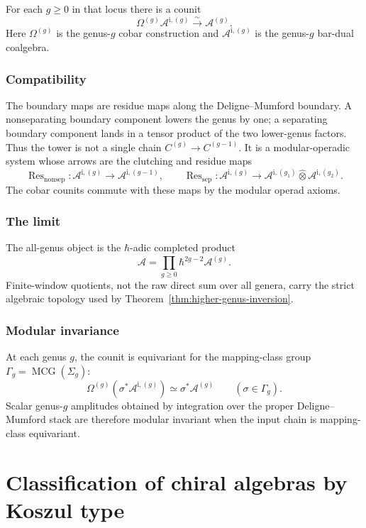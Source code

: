 For each $g\geq 0$ in that locus there is a counit
\[
\Omega^{(g)}\mathcal{A}^{\mathrm i,(g)}
\xrightarrow{\;\sim\;}
\mathcal{A}^{(g)}.
\]
Here $\Omega^{(g)}$ is the genus-$g$ cobar construction and
$\mathcal{A}^{\mathrm i,(g)}$ is the genus-$g$ bar-dual coalgebra.

\subsubsection{Compatibility}

The boundary maps are residue maps along the Deligne--Mumford
boundary. A nonseparating boundary component lowers the genus by one;
a separating boundary component lands in a tensor product of the two
lower-genus factors. Thus the tower is not a single chain
$C^{(g)}\to C^{(g-1)}$. It is a modular-operadic system whose arrows
are the clutching and residue maps
\[
\operatorname{Res}_{\mathrm{nonsep}}\colon
\mathcal{A}^{\mathrm i,(g)}
\to \mathcal{A}^{\mathrm i,(g-1)},\qquad
\operatorname{Res}_{\mathrm{sep}}\colon
\mathcal{A}^{\mathrm i,(g)}
\to
\mathcal{A}^{\mathrm i,(g_1)}\widehat{\otimes}
\mathcal{A}^{\mathrm i,(g_2)}.
\]
The cobar counits commute with these maps by the modular operad
axioms.

\subsubsection{The limit}

The all-genus object is the $\hbar$-adic completed product
\[
\widehat{\mathcal{A}}
=\prod_{g\geq 0}\hbar^{2g-2}\mathcal{A}^{(g)}.
\]
Finite-window quotients, not the raw direct sum over all genera, carry
the strict algebraic topology used by Theorem~\ref{thm:higher-genus-inversion}.

\subsubsection{Modular invariance}

At each genus $g$, the counit is equivariant for the mapping-class
group $\Gamma_g=\operatorname{MCG}(\Sigma_g)$:
\[
\Omega^{(g)}(\sigma^*\mathcal{A}^{\mathrm i,(g)})
\simeq
\sigma^*\mathcal{A}^{(g)}
\qquad(\sigma\in\Gamma_g).
\]
Scalar genus-$g$ amplitudes obtained by integration over the proper
Deligne--Mumford stack are therefore modular invariant when the input
chain is mapping-class equivariant.


\section{Classification of chiral algebras by Koszul type}
\label{app:koszul-classification}

